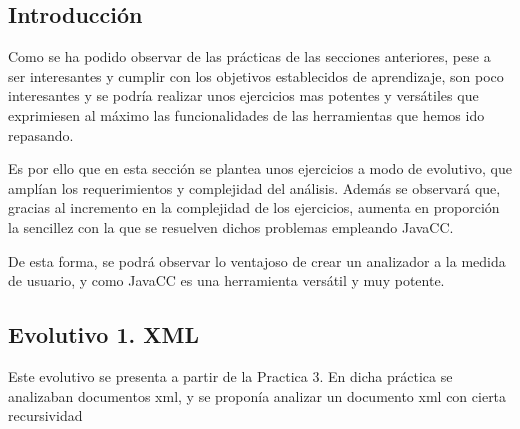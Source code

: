 \subsection{Introducción}

\noindent Como se ha podido observar de las prácticas de las secciones anteriores, pese a ser interesantes y cumplir con los objetivos establecidos de aprendizaje, son poco interesantes y se podría realizar unos ejercicios mas potentes y versátiles que exprimiesen al máximo las funcionalidades de las herramientas que hemos ido repasando.

Es por ello que en esta sección se plantea unos ejercicios a modo de evolutivo, que amplían los requerimientos y complejidad del análisis. Además se observará que, gracias al incremento en la complejidad de los ejercicios, aumenta en proporción la sencillez con la que se resuelven dichos problemas empleando JavaCC.

De esta forma, se podrá observar lo ventajoso de crear un analizador a la medida de usuario, y como JavaCC es una herramienta versátil y muy potente.


\subsection{Evolutivo 1. XML}

\noindent Este evolutivo se presenta a partir de la Practica 3. En dicha práctica se analizaban documentos xml, y se proponía analizar un documento xml con cierta recursividad
